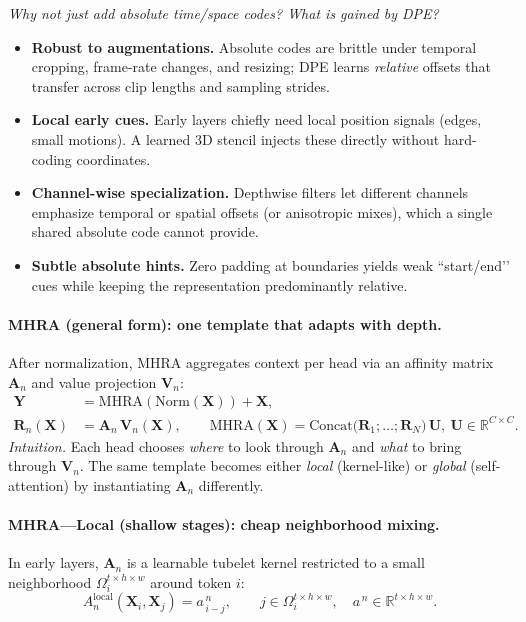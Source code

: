 \begin{enrichment}
\begin{enrichment}
        \emph{Why not just add absolute time/space codes? What is gained by DPE?}
        \begin{itemize}
            \item \textbf{Robust to augmentations.} Absolute codes are brittle under temporal cropping, frame-rate changes, and resizing; DPE learns \emph{relative} offsets that transfer across clip lengths and sampling strides. 
            \item \textbf{Local early cues.} Early layers chiefly need local position signals (edges, small motions). A learned \(3\mathrm{D}\) stencil injects these directly without hard-coding coordinates. 
            \item \textbf{Channel-wise specialization.} Depthwise filters let different channels emphasize temporal or spatial offsets (or anisotropic mixes), which a single shared absolute code cannot provide. 
            \item \textbf{Subtle absolute hints.} Zero padding at boundaries yields weak “start/end’’ cues while keeping the representation predominantly relative. 
        \end{itemize}
        
        \paragraph{MHRA (general form): one template that adapts with depth.}
        After normalization, MHRA aggregates context per head via an affinity matrix \(\bm{A}_n\) and value projection \(\bm{V}_n\):
        \begin{align}
            \bm{Y} &= \mathrm{MHRA}(\mathrm{Norm}(\bm{X})) + \bm{X}, \label{eq:uni_mhra} \\[-1mm]
            \bm{R}_n(\bm{X}) &= \bm{A}_n\,\bm{V}_n(\bm{X}), \qquad
            \mathrm{MHRA}(\bm{X})=\mathrm{Concat}\big(\bm{R}_1;\dots;\bm{R}_N\big)\,\bm{U},\ \bm{U}\in\mathbb{R}^{C\times C}.
            \label{eq:uni_mhra_general}
        \end{align}
        \emph{Intuition.} Each head chooses \emph{where} to look through \(\bm{A}_n\) and \emph{what} to bring through \(\bm{V}_n\). The same template becomes either \emph{local} (kernel-like) or \emph{global} (self-attention) by instantiating \(\bm{A}_n\) differently.
        
        \paragraph{MHRA—Local (shallow stages): cheap neighborhood mixing.}
        In early layers, \(\bm{A}_n\) is a learnable tubelet kernel restricted to a small neighborhood \(\Omega^{t\times h\times w}_i\) around token \(i\):
        \begin{equation}
            A_{n}^{\mathrm{local}}(\bm{X}_i,\bm{X}_j)=a^{\,n}_{\,i-j}, \qquad j\in\Omega^{t\times h\times w}_i,\quad a^{\,n}\in\mathbb{R}^{t\times h\times w}.
            \label{eq:uni_local}
        \end{equation}
        

\end{enrichment}
\end{enrichment}
